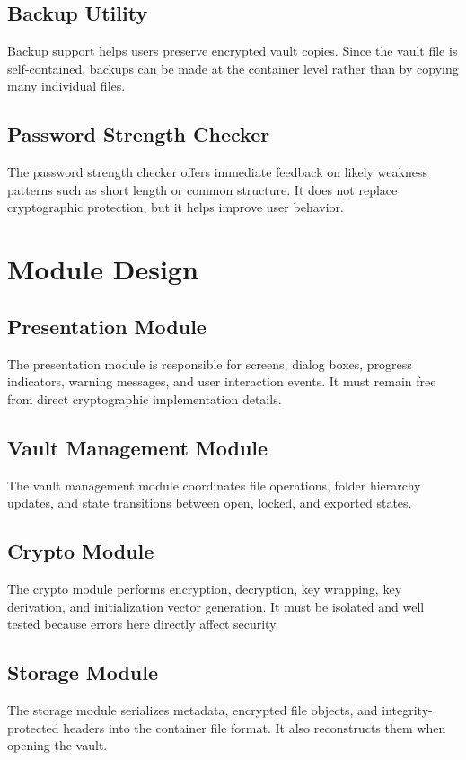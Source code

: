 \documentclass[12pt,a4paper]{report}
\begin{document}
\section{Backup Utility}
Backup support helps users preserve encrypted vault copies. Since the vault file is self-contained, backups can be made at the container level rather than by copying many individual files.

\section{Password Strength Checker}
The password strength checker offers immediate feedback on likely weakness patterns such as short length or common structure. It does not replace cryptographic protection, but it helps improve user behavior.

\chapter{Module Design}
\section{Presentation Module}
The presentation module is responsible for screens, dialog boxes, progress indicators, warning messages, and user interaction events. It must remain free from direct cryptographic implementation details.

\section{Vault Management Module}
The vault management module coordinates file operations, folder hierarchy updates, and state transitions between open, locked, and exported states.

\section{Crypto Module}
The crypto module performs encryption, decryption, key wrapping, key derivation, and initialization vector generation. It must be isolated and well tested because errors here directly affect security.

\section{Storage Module}
The storage module serializes metadata, encrypted file objects, and integrity-protected headers into the container file format. It also reconstructs them when opening the vault.
\end{document}
